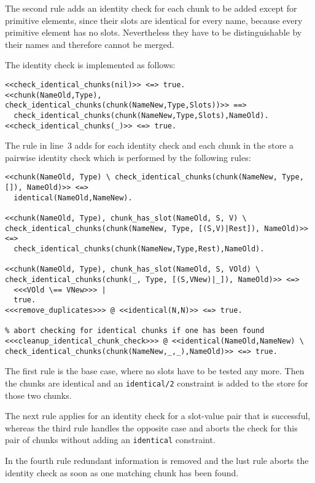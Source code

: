 The second rule adds an identity check for each chunk to be added except for primitive elements, since their slots are identical for every name, because every primitive element has no slots. Nevertheless they have to be distinguishable by their names and therefore cannot be merged.

The identity check is implemented as follows:

\begin{lstlisting}
<<check_identical_chunks(nil)>> <=> true.
<<chunk(NameOld,Type), check_identical_chunks(chunk(NameNew,Type,Slots))>> ==> 
  check_identical_chunks(chunk(NameNew,Type,Slots),NameOld).  
<<check_identical_chunks(_)>> <=> true.
\end{lstlisting}

The rule in line~3 adds for each identity check and each chunk in the store a pairwise identity check which is performed by the following rules:

\begin{lstlisting}
<<chunk(NameOld, Type) \ check_identical_chunks(chunk(NameNew, Type, []), NameOld)>> <=> 
  identical(NameOld,NameNew).
  
<<chunk(NameOld, Type), chunk_has_slot(NameOld, S, V) \ check_identical_chunks(chunk(NameNew, Type, [(S,V)|Rest]), NameOld)>> <=> 
  check_identical_chunks(chunk(NameNew,Type,Rest),NameOld).
  
<<chunk(NameOld, Type), chunk_has_slot(NameOld, S, VOld) \ check_identical_chunks(chunk(_, Type, [(S,VNew)|_]), NameOld)>> <=> 
  <<<VOld \== VNew>>> |
  true.
<<<remove_duplicates>>> @ <<identical(N,N)>> <=> true.

% abort checking for identical chunks if one has been found
<<<cleanup_identical_chunk_check>>> @ <<identical(NameOld,NameNew) \ check_identical_chunks(chunk(NameNew,_,_),NameOld)>> <=> true.
\end{lstlisting}

The first rule is the base case, where no slots have to be tested any more. Then the chunks are identical and an \lstinline|identical/2| constraint is added to the store for those two chunks.

The next rule applies for an identity check for a slot-value pair that is successful, whereas the third rule handles the opposite case and aborts the check for this pair of chunks without adding an \lstinline|identical| constraint.

In the fourth rule redundant information is removed and the lust rule aborts the identity check as soon as one matching chunk has been found.

